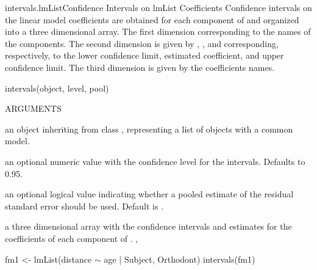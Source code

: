 \documentclass[pdftex]{article} \usepackage{url,graphicx}
\renewcommand{\Twiddle}{\mbox{\(\sim\)}}
\begin{document}
\begin{Helpfile}{intervals.lmList}{Confidence Intervals on lmList Coefficients}
Confidence intervals on the linear model coefficients are obtained for
each  component of  and organized into a three
dimensional array. The first dimension corresponding to the names
of the  components. The second dimension is given by
, , and  corresponding,
respectively, to the lower confidence limit, estimated coefficient,
and upper confidence limit. The third dimension is given by the
coefficients names.
\begin{Example}
intervals(object, level, pool)
\end{Example}
\begin{Argument}{ARGUMENTS}
\item[\Co{object:}]
an object inheriting from class , representing
a list of  objects with a common model.
\item[\Co{level:}]
an optional numeric value with the confidence level for
the intervals. Defaults to 0.95.
\item[\Co{pool:}]
an optional logical value indicating whether a pooled
estimate of the residual standard error should be used. Default is
.
\end{Argument}
a three dimensional array with the confidence intervals and estimates
for the coefficients of each  component of .
, 
\need 15pt
\vspace{-16pt}
\begin{Example}
fm1 <- lmList(distance {\Twiddle} age | Subject, Orthodont)
intervals(fm1)
\end{Example}
\end{Helpfile}
\end{document}
